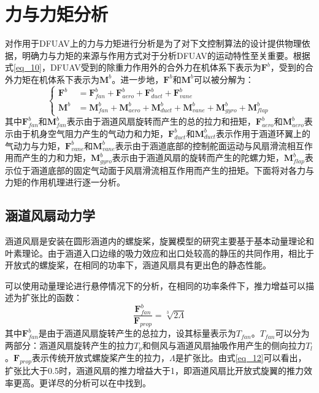\section{力与力矩分析}

对作用于DFUAV上的力与力矩进行分析是为了对下文控制算法的设计提供物理依据，明确力与力矩的来源与作用方式对于分析DFUAV的运动特性至关重要。根据式\eqref{eq_10}，DFUAV受到的除重力作用外的合外力在机体系下表示为$\boldsymbol{F}^b$，受到的合外力矩在机体系下表示为$\boldsymbol{M}^b$。进一步地，$\boldsymbol{F}^b$和$\boldsymbol{M}^b$可以被分解为：
\begin{equation}
    \left\{
    \begin{aligned}
        \boldsymbol{F}^b&=\boldsymbol{F}_{fan}^b+\boldsymbol{F}_{aero}^b+\boldsymbol{F}_{duct}^b+\boldsymbol{F}_{vane}^b \\
        \boldsymbol{M}^b&=\boldsymbol{M}_{fan}^b+\boldsymbol{M}_{aero}^b+\boldsymbol{M}_{duct}^b+\boldsymbol{M}_{vane}^b+\boldsymbol{M}_{gyro}^b+\boldsymbol{M}_{flap}^b
    \end{aligned}
\right.
\label{eq_11}
\end{equation}
其中$\boldsymbol{F}_{fan}^b$和$\boldsymbol{M}_{fan}^b$表示由于涵道风扇旋转而产生的总的拉力和扭矩，$\boldsymbol{F}_{aero}^b$和$\boldsymbol{M}_{aero}^b$表示由于机身空气阻力产生的气动力和力矩，$\boldsymbol{F}_{duct}^b$和$\boldsymbol{M}_{duct}^b$表示作用于涵道环翼上的气动力与力矩，$\boldsymbol{F}_{vane}^b$和$\boldsymbol{M}_{vane}^b$表示由于涵道底部的控制舵面运动与风扇滑流相互作用而产生的力和力矩，$\boldsymbol{M}_{gyro}^b$表示由于涵道风扇的旋转而产生的陀螺力矩，$\boldsymbol{M}_{flap}^b$表示位于涵道底部的固定气动面于风扇滑流相互作用而产生的扭矩。下面将对各力与力矩的作用机理进行逐一分析。

\subsection{涵道风扇动力学}

涵道风扇是安装在圆形涵道内的螺旋桨，旋翼模型的研究主要基于基本动量理论和叶素理论。由于涵道入口边缘的吸力效应和出口处较高的静压的共同作用，相比于开放式的螺旋桨，在相同的功率下，涵道风扇具有更出色的静态性能。

可以使用动量理论进行悬停情况下的分析，在相同的功率条件下，推力增益可以描述为扩张比的函数：
\begin{equation}
    \dfrac{\boldsymbol{F}_{fan}^b}{\boldsymbol{F}_{prop}}={\sqrt[3]{2\Lambda}}
    \label{eq_12}
\end{equation}
其中$\boldsymbol{F}_{fan}^b$是由于涵道风扇旋转产生的总拉力，设其标量表示为$T_{fan}$。$T_{fan}$可以分为两部分：涵道风扇旋转产生的拉力$T_{p}$和侧风与涵道风扇抽吸作用产生的侧向拉力$T_{l}$。$\boldsymbol{F}_{prop}$表示传统开放式螺旋桨产生的拉力，$\Lambda$是扩张比。由式\eqref{eq_12}可以看出，扩张比大于0.5时，涵道风扇的推力增益大于1，即涵道风扇比开放式旋翼的推力效率更高。更详尽的分析可以在\parencite{pereiraHoverWindtunnelTesting2008}中找到。

